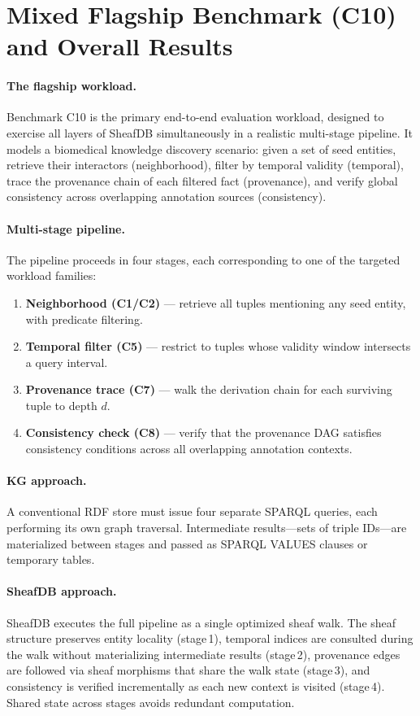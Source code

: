\section{Mixed Flagship Benchmark (C10) and Overall Results}
\label{sec:mixed_flagship}

\paragraph{The flagship workload.}
Benchmark C10 is the primary end-to-end evaluation workload, designed to exercise all layers of SheafDB simultaneously in a realistic multi-stage pipeline. It models a biomedical knowledge discovery scenario: given a set of seed entities, retrieve their interactors (neighborhood), filter by temporal validity (temporal), trace the provenance chain of each filtered fact (provenance), and verify global consistency across overlapping annotation sources (consistency).

\paragraph{Multi-stage pipeline.}
The pipeline proceeds in four stages, each corresponding to one of the targeted workload families:
\begin{enumerate}
  \item \textbf{Neighborhood (C1/C2)} --- retrieve all tuples mentioning any seed entity, with predicate filtering.
  \item \textbf{Temporal filter (C5)} --- restrict to tuples whose validity window intersects a query interval.
  \item \textbf{Provenance trace (C7)} --- walk the derivation chain for each surviving tuple to depth $d$.
  \item \textbf{Consistency check (C8)} --- verify that the provenance DAG satisfies consistency conditions across all overlapping annotation contexts.
\end{enumerate}

\paragraph{KG approach.}
A conventional RDF store must issue four separate SPARQL queries, each performing its own graph traversal. Intermediate results---sets of triple IDs---are materialized between stages and passed as SPARQL VALUES clauses or temporary tables.

\paragraph{SheafDB approach.}
SheafDB executes the full pipeline as a single optimized sheaf walk. The sheaf structure preserves entity locality (stage\,1), temporal indices are consulted during the walk without materializing intermediate results (stage\,2), provenance edges are followed via sheaf morphisms that share the walk state (stage\,3), and consistency is verified incrementally as each new context is visited (stage\,4). Shared state across stages avoids redundant computation.

